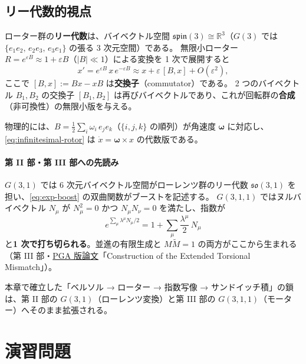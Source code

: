 \documentclass[dvipdfmx,a4paper,oneside]{jsbook}
\numberwithin{equation}{chapter}
\begin{document}
\subsection{リー代数的視点}

ローター群の\textbf{リー代数}は、バイベクトル空間 \(\mathfrak{spin}(3) \cong \mathbb{R}^3\)（\(G(3)\) では \(\{e_1 e_2,\, e_2 e_3,\, e_3 e_1\}\) の張る 3 次元空間）である。
無限小ローター \(R = e^{\varepsilon B} \approx 1 + \varepsilon B\)（\(|B|\ll 1\)）による変換を 1 次で展開すると
\begin{equation}
  x' = e^{\varepsilon B}\,x\,e^{-\varepsilon B}
  \approx x + \varepsilon\,[B, x] + O(\varepsilon^2),
  \label{eq:infinitesimal-rotor}
\end{equation}
ここで \([B,x] := Bx - xB\) は\textbf{交換子}（commutator）である。
2 つのバイベクトル \(B_1,B_2\) の交換子 \([B_1,B_2]\) は再びバイベクトルであり、これが回転群の\textbf{合成}（非可換性）の無限小版を与える。

物理的には、\(B = \tfrac{1}{2}\sum_i \omega_i\, e_j e_k\)（\(\{i,j,k\}\) の順列）が角速度 \(\boldsymbol{\omega}\) に対応し、\eqref{eq:infinitesimal-rotor} は \(\dot{x} = \boldsymbol{\omega}\times x\) の代数版である。

\paragraph{第 II 部・第 III 部への先読み}
\(G(3,1)\) では 6 次元バイベクトル空間がローレンツ群のリー代数 \(\mathfrak{so}(3,1)\) を担い、\eqref{eq:exp-boost} の双曲関数がブーストを記述する。
\(G(3,1,1)\) ではヌルバイベクトル \(N_\mu\) が \(N_\mu^2 = 0\) かつ \(N_\mu N_\nu = 0\) を満たし、指数が
\begin{equation}
  e^{\sum_\mu \lambda^\mu N_\mu / 2}
  = 1 + \sum_\mu \frac{\lambda^\mu}{2}\,N_\mu
  \label{eq:exp-null-truncation}
\end{equation}
と\textbf{1 次で打ち切られる}。並進の有限生成と \(M\widetilde{M}=1\) の両方がここから生まれる（第 III 部・\hyperref[sec:sister-manuscripts]{PGA 版論文}「Construction of the Extended Torsional Mismatch」）。

本章で確立した「ベルソル → ローター → 指数写像 → サンドイッチ積」の鎖は、第 II 部の \(G(3,1)\)（ローレンツ変換）と第 III 部の \(G(3,1,1)\)（モーター）へそのまま拡張される。

\section*{演習問題}
\end{document}
